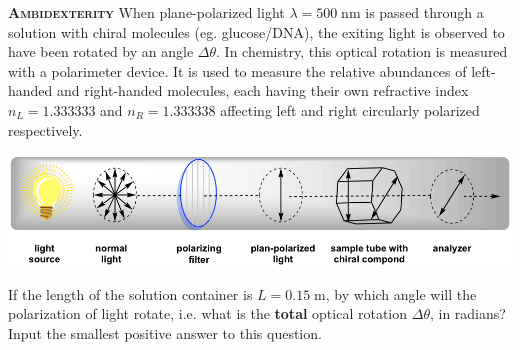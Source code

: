 \begin{problem}
{\textbf{\textsc{Ambidexterity}}}
When plane-polarized light $\lambda = 500\;\mathrm{nm}$ is passed through a solution with chiral molecules (eg. glucose/DNA), the exiting light is observed to have been rotated by an angle $\Delta \theta$. In chemistry, this optical rotation is measured with a polarimeter device. It is used to measure the relative abundances of left-handed and right-handed molecules, each having their own refractive index $n_L = 1.333333$ and $n_R = 1.333338$ affecting left and right circularly polarized respectively. 

\begin{center}
\includegraphics[width=.8\textwidth]{problems/figures/opticalRotationSchematic.png}
\end{center}

If the length of the solution container is $L = 0.15\;\mathrm{m}$, by which angle will the polarization of light rotate, i.e. what is the \textbf{total} optical rotation $\Delta \theta$, in radians? Input the smallest positive answer to this question.
\end{problem}
